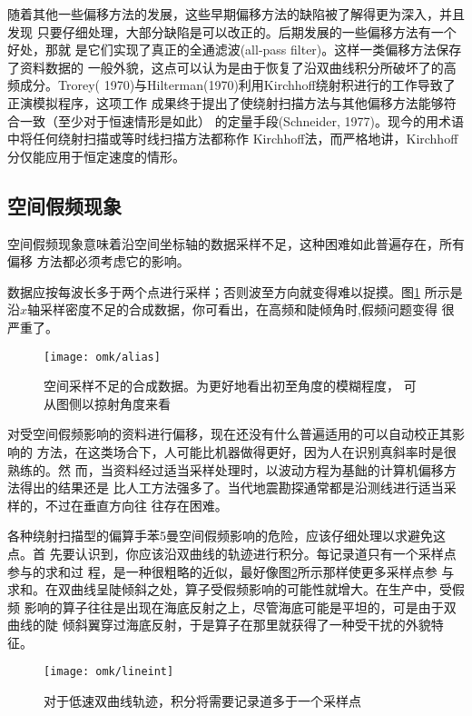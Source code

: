 随着其他一些偏移方法的发展，这些早期偏移方法的缺陷被了解得更为深入，并且发现
只要仔细处理，大部分缺陷是可以改正的。后期发展的一些偏移方法有一个好处，那就
是它们实现了真正的全通滤波(all-pass filter)。这样一类偏移方法保存了资料数据的
一般外貌，这点可以认为是由于恢复了沿双曲线积分所破坏了的高频成分。Trorey(
1970)与Hilterman(1970)利用Kirchhoff绕射积进行的工作导致了正演模拟程序，这项工作
成果终于提出了使绕射扫描方法与其他偏移方法能够符合一致（至少对于恒速情形是如此）
的定量手段(Schneider, 1977)。现今的用术语中将任何绕射扫描或等时线扫描方法都称作
Kirchhoff法，而严格地讲，Kirchhoff分仅能应用于恒定速度的情形。

\subsection{空间假频现象}
\label{sec:1.4}

空间假频现象意味着沿空间坐标轴的数据采样不足，这种困难如此普遍存在，所有偏移
方法都必须考虑它的影响。

数据应按每波长多于两个点进行采样；否则波至方向就变得难以捉摸。图\ref{fig:omk/alias}
所示是沿$x$轴采样密度不足的合成数据，你可看出，在高频和陡倾角时,假频问题变得
很严重了。
\begin{figure}[H]
\centering
\texttt{[image: omk/alias]}
\caption[alias]{空间采样不足的合成数据。为更好地看出初至角度的模糊程度，
可从图侧以掠射角度来看}
\label{fig:omk/alias}
\end{figure}
对受空间假频影响的资料进行偏移，现在还没有什么普遍适用的可以自动校正其影响的
方法，在这类场合下，人可能比机器做得更好，因为人在识别真斜率时是很熟练的。然
而，当资料经过适当采样处理时，以波动方程为基飿的计算机偏移方法得出的结果还是
比人工方法强多了。当代地震勘探通常都是沿测线进行适当采样的，不过在垂直方向往
往存在困难。

各种绕射扫描型的偏算手苯5曼空间假频影响的危险，应该仔细处理以求避免这点。首
先要认识到，你应该沿双曲线的轨迹进行积分。每记录道只有一个采样点参与的求和过
程，是一种很粗略的近似，最好像图\ref{fig:omk/lineint}所示那样使更多采样点参
与求和。在双曲线呈陡倾斜之处，算子受假频影响的可能性就增大。在生产中，受假频
影响的算子往往是出现在海底反射之上，尽管海底可能是平坦的，可是由于双曲线的陡
倾斜翼穿过海底反射，于是算子在那里就获得了一种受干扰的外貌特征。
\begin{figure}[H]
\centering
\texttt{[image: omk/lineint]}
\caption[lineint]{对于低速双曲线轨迹，积分将需要记录道多于一个采样点}
\label{fig:omk/lineint}
\end{figure}

